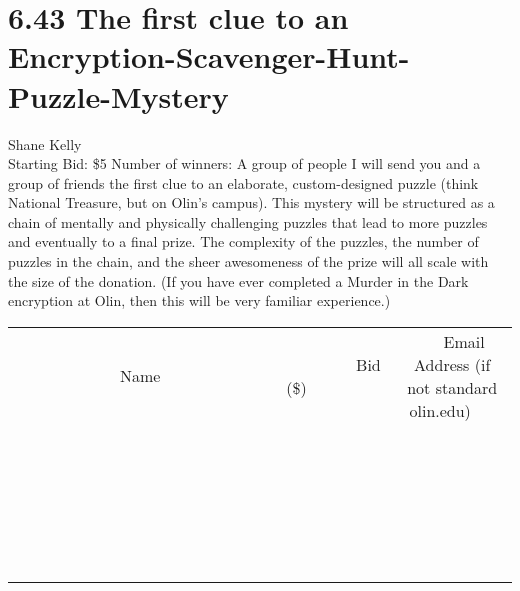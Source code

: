 \documentclass[11pt]{article}
\begin{document}
\section*{6.43 The first clue to an Encryption-Scavenger-Hunt-Puzzle-Mystery}
Shane Kelly
\\
Starting Bid: \$5
\newline
Number of winners: A group of people
\newline
I will send you and a group of friends the first clue to an elaborate, custom-designed puzzle (think National Treasure, but on Olin's campus). This mystery will be structured as a chain of mentally and physically challenging puzzles that lead to more puzzles and eventually to a final prize. The complexity of the puzzles, the number of puzzles in the chain, and the sheer awesomeness of the prize will all scale with the size of the donation. (If you have ever completed a Murder in the Dark encryption at Olin, then this will be very familiar experience.)
\\[6ex]
\begin{tabular}{c c c}
~~~~~~~~~~~~~Name~~~~~~~~~~~~~ & ~~~~~~~~~Bid (\$)~~~~~~~~~  & ~~~Email Address (if not standard olin.edu)~~~\\
 & & \\
\hline
 & & \\
\hline
 & & \\
\hline
 & & \\
\hline
 & & \\
\hline
 & & \\
\hline
 & & \\
\hline
 & & \\
\hline
 & & \\
\hline
 & & \\
\hline
 & & \\
\hline
 & & \\
\hline
 & & \\
\hline
 & & \\
\hline
 & & \\
\hline
 & & \\
\hline
 & & \\
\hline
 & & \\
\hline
 & & \\
\hline
 & & \\
\hline
 & & \\
\hline
 & & \\
\hline
 & & \\
\hline
 & & \\
\hline
 & & \\
\hline
 & & \\
\hline
\end{tabular}
\newpage
\end{document}
